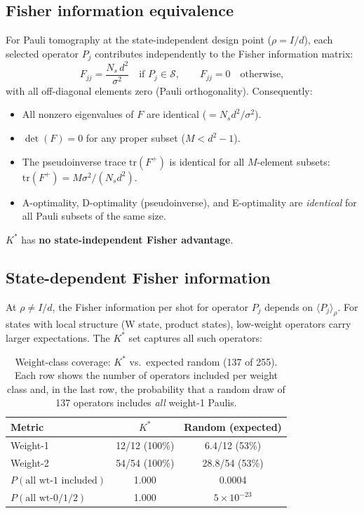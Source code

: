 \documentclass[twocolumn,prx,aps,superscriptaddress,longbibliography,floatfix]{revtex4-2}
\begin{document}
\subsection{Fisher information equivalence}
\label{sec:fisher-equiv}

For Pauli tomography at the state-independent design point
($\rho = I/d$), each selected operator $P_j$ contributes
independently to the Fisher information matrix:
\begin{equation}
F_{jj} = \frac{N_s \, d^2}{\sigma^2}
\quad \text{if } P_j \in \mathcal{S}, \qquad
F_{jj} = 0 \quad \text{otherwise},
\end{equation}
with all off-diagonal elements zero (Pauli orthogonality).
Consequently:
\begin{itemize}
\item All nonzero eigenvalues of $F$ are identical
($= N_s d^2 / \sigma^2$).
\item $\det(F) = 0$ for any proper subset ($M < d^2 - 1$).
\item The pseudoinverse trace $\mathrm{tr}(F^+)$ is identical for
all $M$-element subsets: $\mathrm{tr}(F^+) = M \sigma^2 / (N_s d^2)$.
\item A-optimality, D-optimality (pseudoinverse), and E-optimality
are \emph{identical} for all Pauli subsets of the same size.
\end{itemize}

$K^*$ has \textbf{no state-independent Fisher advantage}.

\subsection{State-dependent Fisher information}

At $\rho \neq I/d$, the Fisher information per shot for operator
$P_j$ depends on $\langle P_j \rangle_\rho$.  For states with
local structure (W state, product states), low-weight operators
carry larger expectations.  The $K^*$ set captures all such
operators:

\begin{table}[ht!]
\caption{Weight-class coverage: $K^*$ vs.\ expected random
(137 of 255).  Each row shows the number of operators included
per weight class and, in the last row, the probability that
a random draw of 137 operators includes \emph{all} weight-1
Paulis.}
\label{tab:weight-coverage}
\begin{ruledtabular}
\begin{tabular}{lcc}
Metric & $K^*$ & Random (expected) \\
\hline
Weight-1 & 12/12 (100\%) & 6.4/12 (53\%) \\
Weight-2 & 54/54 (100\%) & 28.8/54 (53\%) \\
$P(\text{all wt-1 included})$ & 1.000 & 0.0004 \\
$P(\text{all wt-0/1/2})$ & 1.000 & $5 \times 10^{-23}$ \\
\end{tabular}
\end{ruledtabular}
\end{table}
\end{document}
